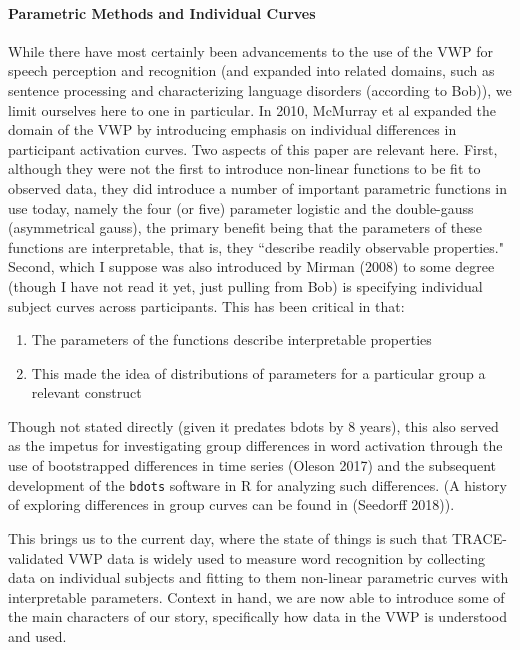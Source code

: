 \documentclass{article}
\newcommand{\xt}{\texttt}%
\begin{document}
\paragraph{Parametric Methods and Individual Curves} While there have most certainly been advancements to the use of the VWP for speech perception and recognition (and expanded into related domains, such as sentence processing and characterizing language disorders (according to Bob)), we  limit ourselves here to one in particular. In 2010, McMurray et al expanded the domain of the VWP by introducing emphasis on individual differences in participant activation curves. Two aspects of this paper are relevant here. First, although they were not the first to introduce non-linear functions to be fit to observed data, they did introduce a number of important parametric functions in use today, namely the four (or five) parameter logistic and the double-gauss (asymmetrical gauss), the primary benefit being that the parameters of these functions are interpretable, that is, they ``describe readily observable properties." Second, which I suppose was also introduced by Mirman (2008) \cite{Mirman2008} to some degree (though I have not read it yet, just pulling from Bob) is specifying individual subject curves across participants. This has been critical in that:

\begin{singlespace}
\begin{enumerate}
\vspace{-3mm}
\item The parameters of the functions describe interpretable properties
\item This made the idea of distributions of parameters for a particular group a relevant construct
\end{enumerate}
\end{singlespace}

Though not stated directly (given it predates bdots by 8 years), this also served as the impetus for investigating group differences in word activation through the use of bootstrapped differences in time series (Oleson 2017) and the subsequent development of the \xt{bdots} software in R for analyzing such differences. (A history of exploring differences in group curves can be found in (Seedorff 2018)).

This brings us to the current day, where the state of things is such that TRACE-validated VWP data is widely used to measure word recognition by collecting data on individual subjects and fitting to them non-linear parametric curves with interpretable parameters. Context in hand, we are now able to introduce some of the main characters of our story, specifically how data in the VWP is understood and used. 
\end{document}
